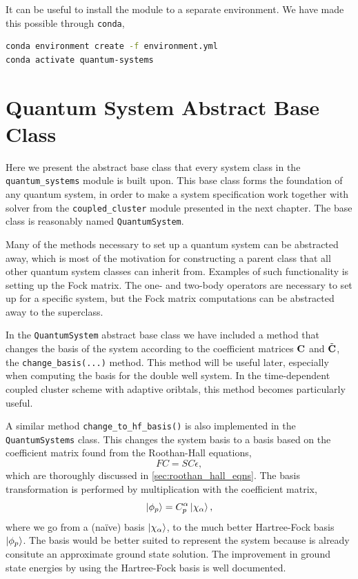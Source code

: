 It can be useful to install the module to a separate environment. We have made this 
possible through \lstinline{conda},
\begin{lstlisting}[language=bash]
conda environment create -f environment.yml
conda activate quantum-systems    
\end{lstlisting}

\section{Quantum System Abstract Base Class} 

Here we present the abstract base class that every system class in the
\lstinline{quantum_systems} module is built upon. This base class forms the foundation 
of any quantum system, in order to make a system specification work together with 
solver from the \lstinline{coupled_cluster} module presented in the next chapter. The base class is 
reasonably named \lstinline{QuantumSystem}.

\begin{figure}[h]

\end{figure}

Many of the methods necessary to set up a quantum system can be abstracted away, which 
is most of the motivation for constructing a parent class that all other 
quantum system classes can inherit from. Examples of such functionality is 
setting up the Fock matrix. The one- and two-body operators are necessary to set up 
for a specific system, but the Fock matrix computations can be abstracted away 
to the superclass.

In the \lstinline{QuantumSystem} abstract base class we have included a
method that changes the basis of the system according to the coefficient matrices 
$\vb{C}$ and $\tilde{\vb{C}}$, the \lstinline{change_basis(...)} method.
This method will be useful later, especially when 
computing the basis for the double well system. In the time-dependent coupled cluster 
scheme with adaptive oribtals, this method becomes particularly useful. 

A similar method \lstinline{change_to_hf_basis()} is also implemented in the 
\lstinline{QuantumSystems} class. This changes the system basis to a basis based 
on the coefficient matrix found from the Roothan-Hall equations,
\begin{equation}
    FC = SC\epsilon,
\end{equation}
which are thoroughly discussed in \autoref{sec:roothan_hall_eqns}.
The basis transformation is performed by multiplication with the coefficient matrix,
\begin{equation}
    \ket{\phi_p} = C^\alpha_p \ket{\chi_\alpha},
\end{equation}
where we go from a (naïve) basis $\ket{\chi_\alpha}$, to the much better Hartree-Fock basis 
$\ket{\phi_p}$. The basis would be better suited to represent the system because is 
already consitute an approximate ground state solution. The improvement in ground state 
energies by using the Hartree-Fock basis is well
documented\cite{jorgensen2011many,lohne2010coupled}.

